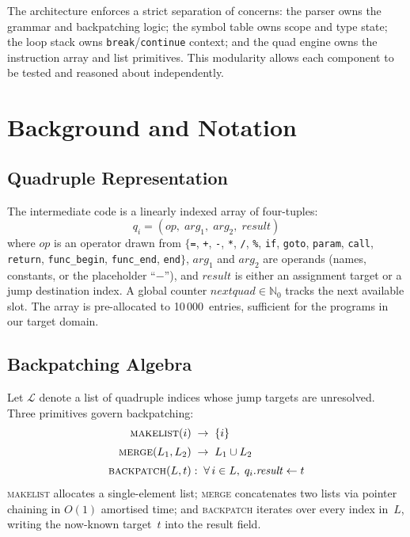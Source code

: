 \documentclass[conference]{IEEEtran}
\begin{document}
The architecture enforces a strict separation of concerns: the parser owns the grammar and backpatching logic; the symbol table owns scope and type state; the loop stack owns \texttt{break}/\texttt{continue} context; and the quad engine owns the instruction array and list primitives. This modularity allows each component to be tested and reasoned about independently.

\section{Background and Notation}
\label{sec:background}

\subsection{Quadruple Representation}
The intermediate code is a linearly indexed array of four-tuples:
\begin{equation}
\label{eq:quad}
q_i = (\mathit{op},\; \mathit{arg}_1,\; \mathit{arg}_2,\; \mathit{result})
\end{equation}
where $\mathit{op}$ is an operator drawn from $\{$\texttt{=}, \texttt{+}, \texttt{-}, \texttt{*}, \texttt{/}, \texttt{\%}, \texttt{if}, \texttt{goto}, \texttt{param}, \texttt{call}, \texttt{return}, \texttt{func\_begin}, \texttt{func\_end}, \texttt{end}$\}$, $\mathit{arg}_1$ and $\mathit{arg}_2$ are operands (names, constants, or the placeholder ``$-$''), and $\mathit{result}$ is either an assignment target or a jump destination index. A global counter $\mathit{nextquad} \in \mathbb{N}_0$ tracks the next available slot. The array is pre-allocated to 10\,000~entries, sufficient for the programs in our target domain.

\subsection{Backpatching Algebra}
Let $\mathcal{L}$ denote a list of quadruple indices whose jump targets are unresolved. Three primitives govern backpatching:
\begin{align}
\textsc{makelist}(i) &\;\to\; \{i\} \label{eq:makelist}\\[2pt]
\textsc{merge}(L_1,L_2) &\;\to\; L_1 \cup L_2 \label{eq:merge}\\[2pt]
\textsc{backpatch}(L,t) &:\; \forall\, i \in L,\; q_i.\mathit{result} \leftarrow t \label{eq:backpatch}
\end{align}
\textsc{makelist} allocates a single-element list; \textsc{merge} concatenates two lists via pointer chaining in $O(1)$ amortised time; and \textsc{backpatch} iterates over every index in~$L$, writing the now-known target~$t$ into the result field.
\end{document}
